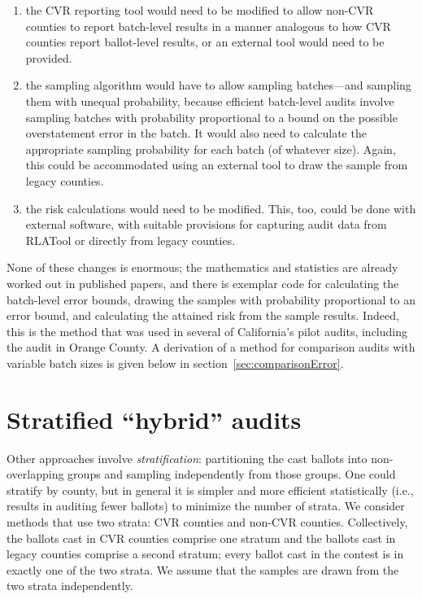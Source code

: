 \documentclass[12pt]{article}
\begin{document}
\begin{enumerate}
  \item the CVR reporting tool would need to be modified to allow non-CVR counties to
report batch-level results in a manner analogous to how CVR counties report
ballot-level results, or an external tool would need to be provided.

  \item the sampling
algorithm would have to allow sampling batches---and sampling them with unequal probability,
because efficient batch-level audits involve sampling batches with probability proportional
to a bound on the possible overstatement error in the batch.
It would also need to calculate the appropriate sampling probability for each batch (of whatever size).
Again, this could be accommodated using an external tool to draw the sample from legacy counties.

  \item the risk calculations would need to be modified. 
This, too, could be done with external software, with suitable provisions for capturing audit data
from RLATool or directly from legacy counties.
\end{enumerate}

None of these changes is enormous; the mathematics and statistics are already worked out
in published papers, and there is exemplar code for calculating the
batch-level error bounds, drawing the samples with probability proportional to an
error bound, and calculating the attained risk from the sample results.
Indeed, this is the method that was used in several of California's pilot audits,
including the audit in Orange County.
A derivation of a method for comparison audits with variable batch sizes is given below
in section~\ref{sec:comparisonError}.

\section{Stratified ``hybrid'' audits}

Other approaches involve \emph{stratification}: partitioning the cast ballots
into non-overlapping groups and sampling independently from those groups.
One could stratify by county, but in general it is simpler and more efficient
statistically (i.e., results in auditing fewer ballots) to minimize the number of strata.
We consider methods that use two strata: CVR counties and non-CVR counties. 
Collectively, the ballots cast in CVR counties comprise one stratum and the ballots cast in 
legacy counties comprise a second stratum; every ballot cast in the contest is in 
exactly one of the two strata. 
We assume that the samples are drawn from the
two strata independently.
\end{document}

